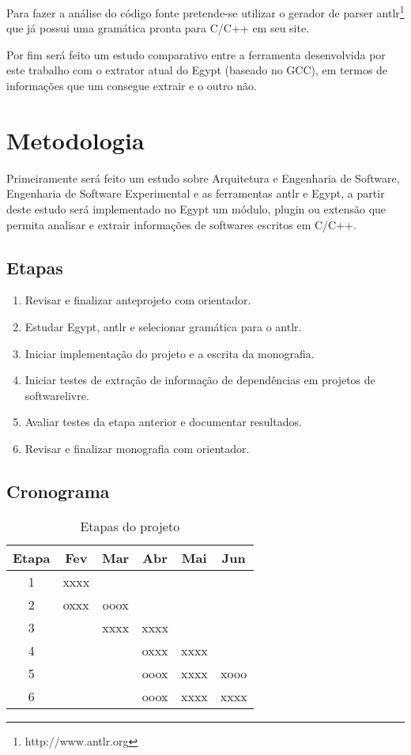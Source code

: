 Para fazer a análise do código fonte pretende-se utilizar o gerador de parser
antlr\footnote{http://www.antlr.org} que já possui uma gramática pronta para C/C++ em
seu site.

Por fim será feito um estudo comparativo entre a ferramenta desenvolvida por
este trabalho com o extrator atual do Egypt (baseado no GCC), em termos de
informações que um consegue extrair e o outro não.

\chapter{Metodologia}

Primeiramente será feito um estudo sobre Arquitetura e Engenharia de Software,
Engenharia de Software Experimental e as ferramentas antlr e Egypt, a partir
deste estudo será implementado no Egypt um módulo, plugin ou extensão que
permita analisar e extrair informações de softwares escritos em C/C++.

\section{Etapas}

\begin{enumerate}
\item Revisar e finalizar anteprojeto com orientador.
\item Estudar Egypt, antlr e selecionar gramática para o antlr.
\item Iniciar implementação do projeto e a escrita da monografia.
\item Iniciar testes de extração de informação de dependências em projetos de softwarelivre.
\item Avaliar testes da etapa anterior e documentar resultados.
\item Revisar e finalizar monografia com orientador.
\end{enumerate}

\section{Cronograma}

\begin{table}
\caption{Etapas do projeto}
\centering
\begin{tabular}{c c c c c c}
Etapa & Fev & Mar & Abr & Mai & Jun \\
\hline
1 & xxxx & & & & \\
2 & oxxx & ooox & & & \\
3 & & xxxx & xxxx & & \\
4 & && oxxx & xxxx & \\
5 & & & ooox & xxxx & xooo \\
6 & & & ooox & xxxx & xxxx \\
\hline
\end{tabular}
\end{table}
